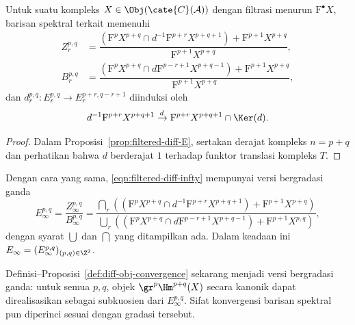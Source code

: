 \begin{proposition}\label{prop:filtered-cplx-ss}
	Untuk suatu kompleks $X\in\Obj(\cate{C}(\mathcal{A}))$ dengan filtrasi
	menurun $\mathrm{F}^\bullet X$, barisan spektral terkait memenuhi
	\begin{align*}
		Z_r^{p,q}&=
		\dfrac{\left(\mathrm{F}^pX^{p+q}\cap
		d^{-1}\mathrm{F}^{p+r}X^{p+q+1}\right)+\mathrm{F}^{p+1}X^{p+q}}
		{\mathrm{F}^{p+1}X^{p+q}}, \\
		B_r^{p,q}&=
		\dfrac{\left(\mathrm{F}^pX^{p+q}\cap
		d\mathrm{F}^{p-r+1}X^{p+q-1}\right)+\mathrm{F}^{p+1}X^{p+q}}
		{\mathrm{F}^{p+1}X^{p+q}},
	\end{align*}
	dan $d_r^{p,q}:E_r^{p,q}\to E_r^{p+r,q-r+1}$ diinduksi oleh
	\[ d^{-1}\mathrm{F}^{p+r}X^{p+q+1}\xrightarrow{d}
	\mathrm{F}^{p+r}X^{p+q+1}\cap\Ker(d). \]
\end{proposition}
\begin{proof}
	Dalam Proposisi~\ref{prop:filtered-diff-E}, sertakan derajat kompleks
	$n=p+q$ dan perhatikan bahwa $d$ berderajat $1$ terhadap funktor translasi
	kompleks $T$.
\end{proof}

Dengan cara yang sama, \eqref{eqn:filtered-diff-infty} mempunyai versi
bergradasi ganda
\begin{equation}\label{eqn:filtered-cplx-infty}
	E_\infty^{p,q}=\dfrac{Z_\infty^{p,q}}{B_\infty^{p,q}}
	=\dfrac{\bigcap_r\left((\mathrm{F}^pX^{p+q}\cap
	d^{-1}\mathrm{F}^{p+r}X^{p+q+1})+\mathrm{F}^{p+1}X^{p+q}\right)}
	{\bigcup_r\left((\mathrm{F}^pX^{p+q}\cap
	d\mathrm{F}^{p-r+1}X^{p+q-1})+\mathrm{F}^{p+1}X^{p,q}\right)},
\end{equation}
dengan syarat $\bigcup$ dan $\bigcap$ yang ditampilkan ada. Dalam keadaan ini
$E_\infty=(E_\infty^{p,q})_{(p,q)\in\Z^2}$.

Definisi--Proposisi~\ref{def:diff-obj-convergence} sekarang menjadi versi
bergradasi ganda: untuk semua $p,q$, objek $\gr^p\Hm^{p+q}(X)$ secara kanonik
dapat direalisasikan sebagai subkuosien dari $E_\infty^{p,q}$. Sifat
konvergensi barisan spektral pun diperinci sesuai dengan gradasi tersebut.

